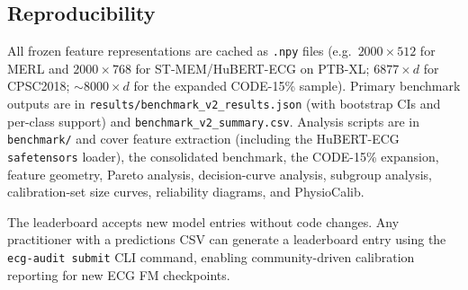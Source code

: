 \subsection{Reproducibility}

All frozen feature representations are cached as \texttt{.npy} files
(e.g.\ $2000\!\times\!512$ for MERL and $2000\!\times\!768$ for ST-MEM/HuBERT-ECG on PTB-XL;
$6877\!\times\!d$ for CPSC2018; ${\sim}8000\!\times\!d$ for the expanded CODE-15\% sample).
Primary benchmark outputs are in \texttt{results/benchmark\_v2\_results.json} (with bootstrap
CIs and per-class support) and \texttt{benchmark\_v2\_summary.csv}.
Analysis scripts are in \texttt{benchmark/} and cover feature extraction (including the
HuBERT-ECG \texttt{safetensors} loader), the consolidated benchmark, the CODE-15\% expansion,
feature geometry, Pareto analysis, decision-curve analysis, subgroup analysis,
calibration-set size curves, reliability diagrams, and PhysioCalib.

The leaderboard accepts new model entries without code changes. Any practitioner with a
predictions CSV can generate a leaderboard entry using the \texttt{ecg-audit submit} CLI
command, enabling community-driven calibration reporting for new ECG FM checkpoints.
